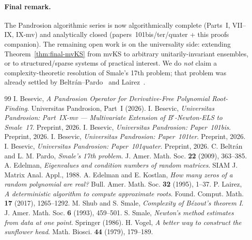 \documentclass[11pt,a4paper]{article}
\begin{document}
\paragraph{Final remark.} The Pandrosion algorithmic series is now algorithmically complete (Parts~I, VII--IX, IX-mv) and analytically closed (papers~101bis/ter/quater + this proofs companion). The remaining open work is on the universality side: extending Theorem~\ref{thm:final-mvKS} from mvKS to arbitrary unitarily-invariant ensembles, or to structured/sparse systems of practical interest. We do \emph{not} claim a complexity-theoretic resolution of Smale's 17th problem; that problem was already settled by Beltr\'an--Pardo~\cite{beltranpardo} and Lairez~\cite{lairez}.

\begin{thebibliography}{99}
 I. Besevic, \textit{A Pandrosion Operator for Derivative-Free Polynomial Root-Finding}. Universitas Pandrosion, Part~I (2026).
 I. Besevic, \textit{Universitas Pandrosion: Part~IX-mv --- Multivariate Extension of B$'$-Newton-ELS to Smale~17}. Preprint, 2026.
 I. Besevic, \textit{Universitas Pandrosion: Paper~101bis}. Preprint, 2026.
 I. Besevic, \textit{Universitas Pandrosion: Paper~101ter}. Preprint, 2026.
 I. Besevic, \textit{Universitas Pandrosion: Paper~101quater}. Preprint, 2026.
 C. Beltr\'an and L. M. Pardo, \textit{Smale's 17th problem}. J. Amer. Math. Soc. \textbf{22} (2009), 363--385.
 A. Edelman, \textit{Eigenvalues and condition numbers of random matrices}. SIAM J. Matrix Anal. Appl., 1988.
 A. Edelman and E. Kostlan, \textit{How many zeros of a random polynomial are real?} Bull. Amer. Math. Soc. \textbf{32} (1995), 1--37.
 P. Lairez, \textit{A deterministic algorithm to compute approximate roots}. Found. Comput. Math. \textbf{17} (2017), 1265--1292.
 M. Shub and S. Smale, \textit{Complexity of B\'ezout's theorem I}. J. Amer. Math. Soc. \textbf{6} (1993), 459--501.
 S. Smale, \textit{Newton's method estimates from data at one point}. Springer (1986).
 H. Vogel, \textit{A better way to construct the sunflower head}. Math. Biosci. \textbf{44} (1979), 179--189.
\end{thebibliography}
\end{document}

